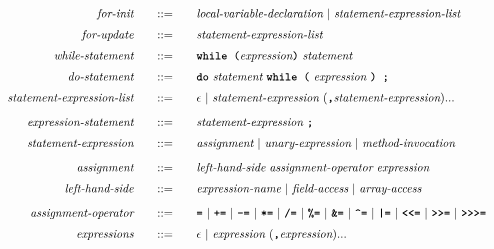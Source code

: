 \begin{alignat*}{9}
&& \textit{for-init}                             && \quad ::= & \quad && \textit{local-variable-declaration} \ | \ \textit{statement-expression-list} && \\[1mm]
&& \textit{for-update}                           && \quad ::= & \quad && \textit{statement-expression-list} && \\[1mm]
&& \textit{while-statement}                      && \quad ::= & \quad && \textbf{\texttt{while (}} \textit{expression} \textbf{\texttt{)}} \ \textit{statement} && \\[1mm]
&& \textit{do-statement}                         && \quad ::= & \quad && \textbf{\texttt{do}} \ \textit{statement} \ \textbf{\texttt{while (}} \ \textit{expression} \ \textbf{\texttt{) ;}}&& \\[1mm]
&& \textit{statement-expression-list}                     && \quad ::= & \quad && \epsilon \ | \ \textit{statement-expression} \ (\textbf{\texttt{,}} \textit{statement-expression}) ... && \\[2mm]
&& \textit{expression-statement}                 && \quad ::= & \quad && \textit{statement-expression} \ \textbf{\texttt{;}} && \\[1mm]
&& \textit{statement-expression}                 && \quad ::= & \quad && \textit{assignment} \ | \ \textit{unary-expression}  \ | \ \textit{method-invocation} && \\[2mm]
&& \textit{assignment}                           && \quad ::= & \quad && \textit{left-hand-side} \ \textit{assignment-operator} \ \textit{expression} && \\[1mm]
&& \textit{left-hand-side}                       && \quad ::= & \quad && \textit{expression-name} \ | \ \textit{field-access} \ | \ \textit{array-access} && \\[2mm]
&& \textit{assignment-operator}                      && \quad ::= & \quad && \textbf{\texttt{=}} \ | \ \textbf{\texttt{+=}} \ | \ \textbf{\texttt{-=}} \ | \ \textbf{\texttt{*=}} \ | \ \textbf{\texttt{/=}} \ | \ \textbf{\texttt{\%=}} \ | \ \textbf{\texttt{\&=}} \ | \ \textbf{\texttt{\string^=}} \ | \ \textbf{\texttt{|=}} \ | \ \textbf{\texttt{<}}\textbf{\texttt{<=}} \ | \ \textbf{\texttt{>}}\textbf{\texttt{>=}} \ | \ \textbf{\texttt{>}}\textbf{\texttt{>}}\textbf{\texttt{>=}}  && \\[1mm]
&& \textit{expressions}                           && \quad ::= & \quad && \epsilon \ | \ \textit{expression} \  (\textbf{\texttt{,}}\textit{expression}) ...&& \\

\end{alignat*}

